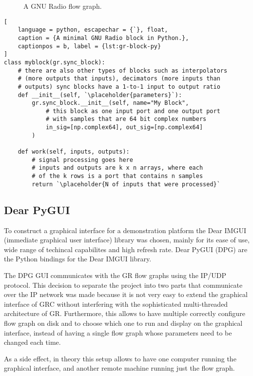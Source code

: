 \begin{figure}
	\caption{
		A GNU Radio flow graph.
		\label{fig:flowgraph}
	}
\end{figure}

{\newcommand{\placeholder}[1]{\textit{\(\langle\)\,\textrm{#1}\,\(\rangle\)}}
\begin{lstlisting}[
	language = python, escapechar = {`}, float,
	caption = {A minimal GNU Radio block in Python.},
	captionpos = b, label = {lst:gr-block-py}
]
class myblock(gr.sync_block):
	# there are also other types of blocks such as interpolators 
	# (more outputs that inputs), decimators (more inputs than 
	# outputs) sync blocks have a 1-to-1 input to output ratio
	def __init__(self, `\placeholder{parameters}`):
		gr.sync_block.__init__(self, name="My Block",
			# this block as one input port and one output port
			# with samples that are 64 bit complex numbers
			in_sig=[np.complex64], out_sig=[np.complex64]
		)

	def work(self, inputs, outputs):
		# signal processing goes here
		# inputs and outputs are k x n arrays, where each
		# of the k rows is a port that contains n samples
		return `\placeholder{N of inputs that were processed}`
\end{lstlisting}}

\subsection{Dear PyGUI}

To construct a graphical interface for a demonstration platform the Dear IMGUI (immediate graphical user interface) library was chosen, mainly for its ease of use, wide range of techincal capabilites and high refresh rate. Dear PyGUI (DPG) are the Python bindings for the Dear IMGUI library.

The DPG GUI communicates with the GR flow graphs using the IP/UDP protocol. This decision to separate the project into two parts that communicate over the IP network was made because it is not very easy to extend the graphical interface of GRC without interfering with the sophisticated multi-threaded architecture of GR. Furthermore, this allows to have multiple correctly configure flow graph on disk and to choose which one to run and display on the graphical interface, instead of having a single flow graph whose parameters need to be changed each time.

As a side effect, in theory this setup allows to have one computer running the graphical interface, and another remote machine running just the flow graph.

